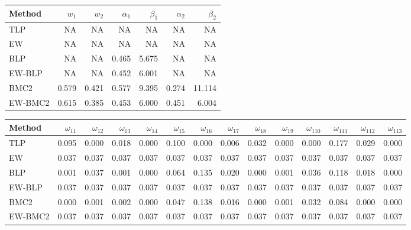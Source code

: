 \documentclass[
]{article}
\begin{document}
\begin{tabular}{lrrrrrr}
\toprule
Method & $w_1$ & $w_2$ & $\alpha_1$ & $\beta_1$ & $\alpha_2$ & $\beta_2$\\
\midrule
TLP & NA & NA & NA & NA & NA & NA\\
EW & NA & NA & NA & NA & NA & NA\\
BLP & NA & NA & 0.465 & 5.675 & NA & NA\\
EW-BLP & NA & NA & 0.452 & 6.001 & NA & NA\\
BMC2 & 0.579 & 0.421 & 0.577 & 9.395 & 0.274 & 11.114\\
EW-BMC2 & 0.615 & 0.385 & 0.453 & 6.000 & 0.451 & 6.004\\
\bottomrule
\end{tabular}

\begin{tabular}{lrrrrrrrrrrrrr}
\toprule
Method & $\omega_{11}$ & $\omega_{12}$ & $\omega_{13}$ & $\omega_{14}$ & $\omega_{15}$ & $\omega_{16}$ & $\omega_{17}$ & $\omega_{18}$ & $\omega_{19}$ & $\omega_{110}$ & $\omega_{111}$ & $\omega_{112}$ & $\omega_{113}$\\
\midrule
TLP & 0.095 & 0.000 & 0.018 & 0.000 & 0.100 & 0.000 & 0.006 & 0.032 & 0.000 & 0.000 & 0.177 & 0.029 & 0.000\\
EW & 0.037 & 0.037 & 0.037 & 0.037 & 0.037 & 0.037 & 0.037 & 0.037 & 0.037 & 0.037 & 0.037 & 0.037 & 0.037\\
BLP & 0.001 & 0.037 & 0.001 & 0.000 & 0.064 & 0.135 & 0.020 & 0.000 & 0.001 & 0.036 & 0.118 & 0.018 & 0.000\\
EW-BLP & 0.037 & 0.037 & 0.037 & 0.037 & 0.037 & 0.037 & 0.037 & 0.037 & 0.037 & 0.037 & 0.037 & 0.037 & 0.037\\
BMC2 & 0.000 & 0.001 & 0.002 & 0.000 & 0.047 & 0.138 & 0.016 & 0.000 & 0.001 & 0.032 & 0.084 & 0.000 & 0.000\\
EW-BMC2 & 0.037 & 0.037 & 0.037 & 0.037 & 0.037 & 0.037 & 0.037 & 0.037 & 0.037 & 0.037 & 0.037 & 0.037 & 0.037\\
\bottomrule
\end{tabular}
\end{document}
